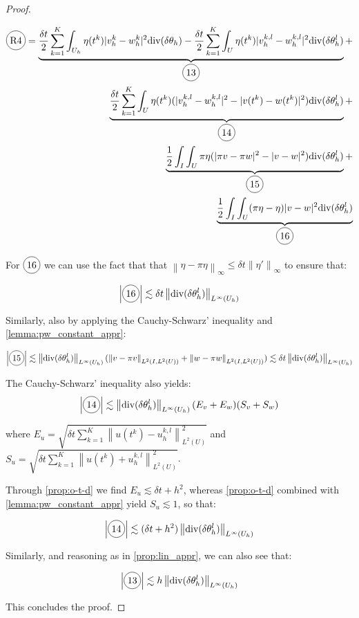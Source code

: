 \documentclass[english,a4paper,10pt,oneside]{scrbook}	%
\theoremstyle{break}
\newenvironment{mproof}[1][\proofname]{%
  \begin{proof}[#1]$ $\par\nobreak\ignorespaces
}{%
  \end{proof}
}
\renewcommand*{\proofname}{Proof}
\theoremstyle{remark}
\newcommand{\ds}{\displaystyle}
\newcommand{\norm}[1]{\left\lVert#1\right\rVert}
\newcommand{\te}{\theta}
\newcommand{\dive}{\text{div}}
\newcommand*\circled[1]{\tikz[baseline=(char.base)]{
            \node[shape=circle,draw,inner sep=2pt] (char) {#1};}}
\begin{document}
\begin{mproof}
\begin{align*}
\circled{R4} =\underbrace{ \frac{\delta t}{2} \sum_{k=1}^{K} \int_{U_h} \eta(t^k)|v_h^k-w_h^k|^2  \dive(\delta \theta_h ) - \frac{\delta t}{2} \sum_{k=1}^{K}\int_{U} \eta(t^k) |v_h^{k,l}-w_h^{k,l}|^2\dive(\delta \te_h^l)}_{\circled{13}}+\\
\underbrace{\frac{\delta t}{2} \sum_{k=1}^{K}\int_{U} \eta(t^k) (|v_h^{k,l}-w_h^{k,l}|^2- |v(t^k)-w(t^k)|^2)\dive(\delta \te_h^l)}_{\circled{14}}+\\
\underbrace{\frac{1}{2}\int_I\int_{U}\pi \eta (|\pi v-\pi w|^2-|v-w|^2)\dive(\delta \te_h^l)}_{\circled{15}}+\\
\underbrace{\frac{1}{2}\int_I\int_{U}(\pi \eta - \eta) |v-w|^2\dive(\delta \te_h^l)}_{\circled{16}}
\end{align*}

For $\circled{16}$ we can use the fact that that $\norm{\eta -\pi \eta}_\infty\leq \delta t \norm{\eta'}_\infty$ to ensure that:

\begin{align*}
	\left | \circled{16} \right |\lesssim \delta t \norm{\dive(\delta \te_h^l)}_{L^\infty(U_h)}
\end{align*}

Similarly, also by applying the Cauchy-Schwarz' inequality and \cref{lemma:pw_constant_appr}:

\begin{align*}
	\left | \circled{15} \right |\lesssim  \norm{\dive(\delta \te_h^l)}_{L^\infty(U_h)} (\norm{v-\pi v}_{L^2(I,L^2(U))}+\norm{w-\pi w}_{L^2(I,L^2(U))})\lesssim \delta t \norm{\dive(\delta \te_h^l)}_{L^\infty(U_h)}
\end{align*}

The Cauchy-Schwarz' inequality also yields:
\begin{align*}
	\left | \circled{14} \right | \lesssim \norm{\dive(\delta \te_h^l)}_{L^\infty(U_h)}(E_v+E_w)(S_v+S_w)
\end{align*}

where $\ds E_u = \sqrt{\delta t \sum_{k=1}^{K}\norm{u(t^k)-u_h^{k,l}}_{L^2(U)}^2}$ and $\ds S_u = \sqrt{\delta t \sum_{k=1}^{K}\norm{u(t^k)+u_h^{k,l}}_{L^2(U)}^2} $.

Through \cref{prop:o-t-d} we find $E_u \lesssim \delta t + h^2$, whereas \cref{prop:o-t-d} combined with \cref{lemma:pw_constant_appr} yield $S_u \lesssim 1$, so that:

\begin{align*}
	\left | \circled{14} \right | \lesssim (\delta t + h^2)\norm{\dive(\delta \te_h^l)}_{L^\infty(U_h)}
\end{align*}


Similarly, and reasoning as in \cref{prop:lin_appr}, we can also see that:

\begin{align*}
	\left | \circled{13} \right | \lesssim h \norm{\dive(\delta \te_h^l)}_{L^\infty(U_h)}
\end{align*}

This concludes the proof.

\end{mproof}
\end{document}
